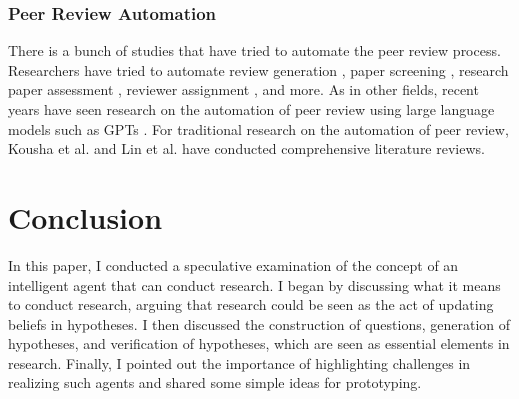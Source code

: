 

\subsubsection{Peer Review Automation}

There is a bunch of studies that have tried to automate the peer review process. Researchers have tried to automate review generation \cite{yuan2022can,yuan2022kid,wang2020reviewrobot}, paper screening \cite{schulz2022future}, research paper assessment \cite{kousha2022artificial}, reviewer assignment \cite{zhao2022reviewer}, and more. As in other fields, recent years have seen research on the automation of peer review using large language models such as GPTs \cite{wexin2023can,liu2023reviewergpt,robertson2023gpt4,hosseini2023fighting}. For traditional research on the automation of peer review,  Kousha et al. \cite{kousha2022artificial} and \cite{lin2021automated1} Lin et al. have conducted comprehensive literature reviews. 

\section{Conclusion}
In this paper, I conducted a speculative examination of the concept of an intelligent agent that can conduct research. I began by discussing what it means to conduct research, arguing that research could be seen as the act of updating beliefs in hypotheses. I then discussed the construction of questions, generation of hypotheses, and verification of hypotheses, which are seen as essential elements in research. Finally, I pointed out the importance of highlighting challenges in realizing such agents and shared some simple ideas for prototyping.

